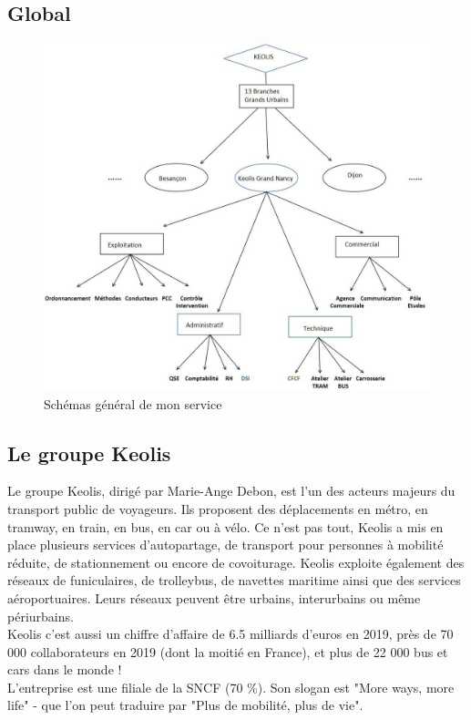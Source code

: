 \documentclass{article}
\begin{document}
    \subsection{Global}
        \begin{figure}[!h]
            \centering
            \includegraphics[scale = 0.75]{Images/Schemas_KEOLIS.JPG}
            \caption{Schémas général de mon service}
        \end{figure}

    \subsection{Le groupe Keolis}
        Le groupe Keolis, dirigé par Marie-Ange Debon, est l'un des acteurs majeurs du transport public de 
        voyageurs. Ils proposent des déplacements en métro, en tramway, en 
        train, en bus, en car ou à vélo. Ce n'est pas tout, Keolis a mis en 
        place plusieurs services d'autopartage, de transport pour personnes 
        à mobilité réduite, de stationnement ou encore de covoiturage. Keolis
        exploite également des réseaux de funiculaires, de trolleybus, de 
        navettes maritime ainsi que des services aéroportuaires. Leurs réseaux peuvent 
        être urbains, interurbains ou même périurbains.\\
        Keolis c'est aussi un chiffre d'affaire de 6.5 milliards d'euros en 2019,
        près de 70 000 collaborateurs en 2019 (dont la moitié en France), et plus 
        de 22 000 bus et cars dans le monde !\\
        L'entreprise est une filiale de la
        SNCF (70 \%). Son slogan est "More ways, more life" - que l'on peut traduire
        par "Plus de mobilité, plus de vie".
\end{document}
